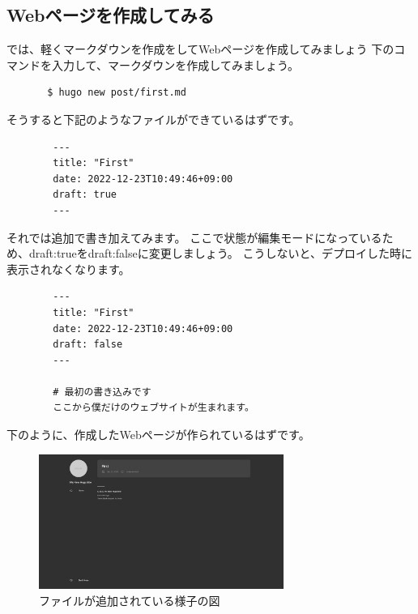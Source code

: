   \subsection{Webページを作成してみる}
    では、軽くマークダウンを作成をしてWebページを作成してみましょう
    下のコマンドを入力して、マークダウンを作成してみましょう。

    \begin{shaded}
      \begin{verbatim}
       $ hugo new post/first.md
      \end{verbatim}
    \end{shaded}

    そうすると下記のようなファイルができているはずです。
    
    \begin{tcolorbox}[breakable]
      \begin{verbatim}
        ---
        title: "First"
        date: 2022-12-23T10:49:46+09:00
        draft: true
        ---
      \end{verbatim}
    \end{tcolorbox}

    それでは追加で書き加えてみます。
    ここで状態が編集モードになっているため、draft:trueをdraft:falseに変更しましょう。
    こうしないと、デプロイした時に表示されなくなります。

    \begin{tcolorbox}[breakable]
      \begin{verbatim}
        ---
        title: "First"
        date: 2022-12-23T10:49:46+09:00
        draft: false
        ---

        # 最初の書き込みです
        ここから僕だけのウェブサイトが生まれます。
      \end{verbatim}
    \end{tcolorbox}

    下のように、作成したWebページが作られているはずです。

    \begin{figure}[H]
      \centering
      \includegraphics[width=8cm]{./image/02-chap5/add-file-list.png}
      \caption{ファイルが追加されている様子の図}
      \label{chap5-add-file-list-image}
    \end{figure}

